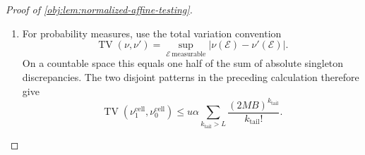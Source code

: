 \begin{proof}[Proof of \cref{obj:lem:normalized-affine-testing}]
\begin{enumerate}
To sum over the counts, use \(1/(\rho+1)!\le1/\rho!\). Coefficientwise, the nonnegative count series obey
\[
\begin{aligned}
\sum_{\rho\ge0}\frac{u^\rho S_1(v)^\rho}{(\rho+1)!}
&\preceq e^{uS_1(v)},\\
\sum_{\gamma\ge0}\frac{w^\gamma S_1(v)^\gamma}{\gamma!}
&=e^{wS_1(v)},\\
\sum_{\kappa\ge0}\frac{M^\kappa S_0(v)^\kappa}{\kappa!}
&=e^{MS_0(v)},
\end{aligned}
\]
where \(\preceq\) means that each coefficient on the left is at most the corresponding coefficient on the right. Thus
\[
0\le a_j^{\mathrm{cnt}}
\le e^{-Mb_0}[v^j]e^{M(S_1(v)+S_0(v))}
=[v^j]e^{Mv}
=\frac{M^j}{j!}.
\]
This calculation cancels the common baseline using
\(S_1(v)+S_0(v)=b_0+v\).
The dominating series is finite:
\[
\sum_{j\ge0}\frac{M^jB^j}{j!}
\sum_{k\ge0}\frac{(MB)^k}{k!}
=e^{2MB}.
\]
Consequently the nonnegative coefficient sums can be interchanged, and the signed discrepancies are absolutely summable. We obtain
\[
\begin{aligned}
\sum_{\rho,\gamma,\kappa\ge0}
|D_{\rho,\gamma,\kappa}^{\mathrm{cnt}}|
&\le
u\alpha\sum_{j\ge0}a_j^{\mathrm{cnt}}B^j
\sum_{\substack{k\ge0\\k+j>L}}\frac{(MB)^k}{k!}\\
&\le
u\alpha\sum_{\substack{j,k\ge0\\j+k>L}}
\frac{(MB)^{j+k}}{j!k!}\\
&=
u\alpha\sum_{k_{\mathrm{tail}}>L}\frac{(2MB)^{k_{\mathrm{tail}}}}{k_{\mathrm{tail}}!}.
\end{aligned}
\]
The last equality uses
\[
\sum_{j=0}^{k_{\mathrm{tail}}}\frac1{j!(k_{\mathrm{tail}}-j)!}=\frac{2^{k_{\mathrm{tail}}}}{k_{\mathrm{tail}}!}.
\]

\item
For probability measures, use the total variation convention
\[
\operatorname{TV}(\nu,\nu')
=\sup_{\mathscr E\ \mathrm{measurable}}
|\nu(\mathscr E)-\nu'(\mathscr E)|.
\]
On a countable space this equals one half of the sum of absolute singleton discrepancies. The two disjoint patterns in the preceding calculation therefore give
\[
\operatorname{TV}(\nu_1^{\mathrm{cell}},\nu_0^{\mathrm{cell}})
\le u\alpha\sum_{k_{\mathrm{tail}}>L}\frac{(2MB)^{k_{\mathrm{tail}}}}{k_{\mathrm{tail}}!}.
\]


\end{enumerate}
\end{proof}
